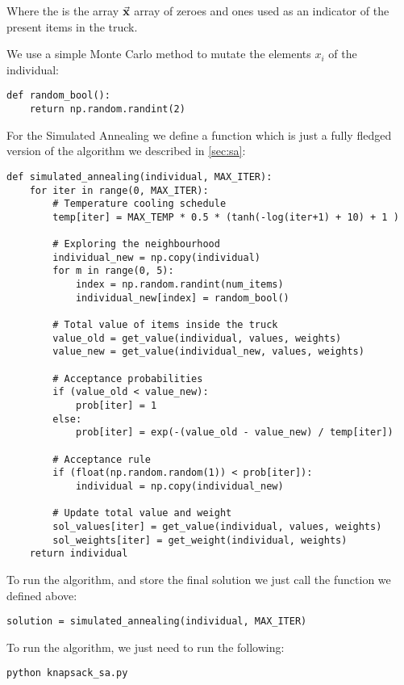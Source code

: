 Where the  is the array $\va{x}$ array of zeroes and ones used as an indicator of the present items in the truck.


We use a simple Monte Carlo method to mutate the elements $x_{i}$ of the individual:
\begin{lstlisting}
def random_bool():
	return np.random.randint(2)
\end{lstlisting}


For the Simulated Annealing we define a function which is just a fully fledged version of the algorithm we described in \cref{sec:sa}:
\begin{lstlisting}
def simulated_annealing(individual, MAX_ITER):
	for iter in range(0, MAX_ITER):
		# Temperature cooling schedule
		temp[iter] = MAX_TEMP * 0.5 * (tanh(-log(iter+1) + 10) + 1 )

		# Exploring the neighbourhood
		individual_new = np.copy(individual)
		for m in range(0, 5):
			index = np.random.randint(num_items)
			individual_new[index] = random_bool()

		# Total value of items inside the truck
		value_old = get_value(individual, values, weights)
		value_new = get_value(individual_new, values, weights)

		# Acceptance probabilities
		if (value_old < value_new):
			prob[iter] = 1
		else:
			prob[iter] = exp(-(value_old - value_new) / temp[iter])

		# Acceptance rule
		if (float(np.random.random(1)) < prob[iter]):
			individual = np.copy(individual_new)

		# Update total value and weight
		sol_values[iter] = get_value(individual, values, weights)
		sol_weights[iter] = get_weight(individual, weights)
	return individual
\end{lstlisting}

To run the algorithm, and store the final solution we just call the function we defined above:
\begin{lstlisting}
solution = simulated_annealing(individual, MAX_ITER)
\end{lstlisting}

\bigskip
To run the algorithm, we just need to run the following:
\begin{lstlisting}
python knapsack_sa.py
\end{lstlisting}